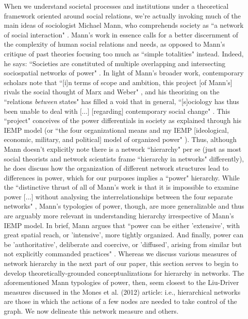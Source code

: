 \documentclass[3p,times]{elsarticle}
\begin{document}
When we understand societal processes and institutions under a theoretical framework oriented around social relations, we're actually invoking much of the main ideas of sociologist Michael Mann, who comprehends society as ``a network of social interaction" \cite{mann1986sources}. Mann's work in essence calls for a better discernment of the complexity of human social relations and needs, as opposed to Mann’s critique of past theories focusing too much as ``simple totalities" instead. Indeed, he says: ``Societies are constituted of multiple overlapping and intersecting sociospatial networks of power" \cite[p. 1]{mann1986sources}. In light of Mann's broader work, contemporary scholars note that ``[i]n terms of scope and ambition, this project [of Mann's] rivals the social thought of Marx and Weber" \cite[p. 338]{schroeder2007mann}, and his theorizing on the ``relations \textit{between} states" has filled a void that in general, ``[s]ociology has thus been unable to deal with [...] [regarding] contemporary social change" \cite[p. 339-340; emphasis in original]{schroeder2007mann}. This ``project" conceives of the power differentials in society as explained through his IEMP model (or ``the four organizational means and my IEMP [ideological, economic, military, and political] model of organized power" \cite[p. 2-3]{mann1986sources}). Thus, although Mann doesn't explicitly note there is a network ``hierarchy" per se (just as most social theorists and network scientists frame ``hierarchy in networks" differently), he does discuss how the organization of different network structures lead to differences in power, which for our purposes implies a ``power" hierarchy. While the ``distinctive thrust of all of Mann's work is that it is impossible to examine power [...] without analysing the interrelationships between the four separate networks" \cite[p. 339]{schroeder2007mann}, Mann's typologies of power, though, are more generalizable and thus are arguably more relevant in understanding hierarchy irrespective of Mann's IEMP model. In brief, Mann argues that ``power can be either 'extensive', with great spatial reach, or 'intensive', more tightly organized. And finally, power can be 'authoritative', deliberate and coercive, or 'diffused', arising from similar but not explicitly commanded practices" \cite[p. 340]{schroeder2007mann}. Whereas we discuss various measures of network hierarchy in the next part of our paper, this section serves to begin to develop theoretically-grounded conceptualizations for hierarchy in networks. The aforementioned Mann \cite{mann1986sources} typologies of power, then, seem closest to the Liu-Driver measures discussed in the Mones et al. (2012) article: i.e., hierarchical networks are those in which the actions of a few nodes are needed to take control of the graph. We now delineate this network measure and others.
\end{document}
